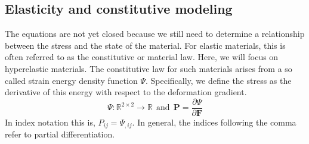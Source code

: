 \documentclass[article]{pcms-l}
\begin{document}
\subsection*{Elasticity and constitutive modeling}
The equations are not yet closed because we still need to determine a relationship between the stress and the state of the material. For elastic materials, this is often referred to as the constitutive or material law. Here, we will focus on hyperelastic materials. The constitutive law for such materials arises from a so called strain energy density function $\Psi$. Specifically, we define the stress as the derivative of this energy with respect to the deformation gradient.
$$
\Psi:\mathbb{R}^{2\times2}\rightarrow\mathbb{R} \ \ \textrm{and} \ \ \mathbf{P}=\frac{\partial\Psi}{\partial\mathbf{F}}
$$
In index notation this is, $P_{ij}=\Psi_{,ij}$. In general, the indices following the comma refer to partial differentiation.
\end{document}
